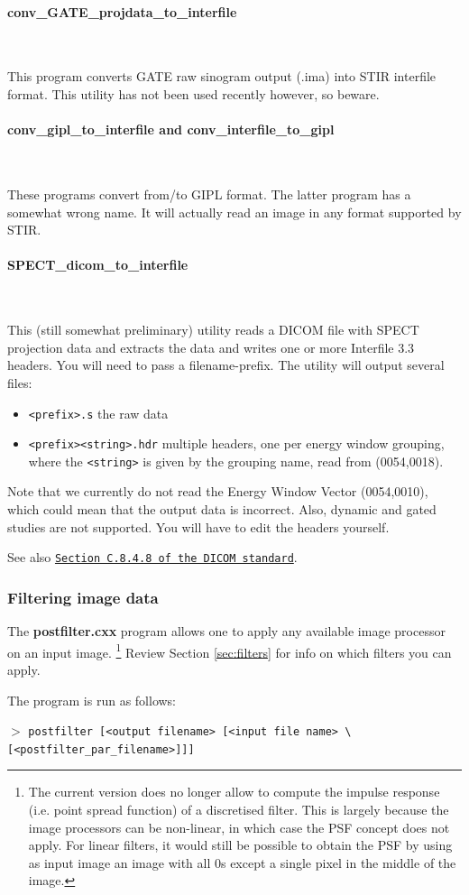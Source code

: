 \documentclass{article}
\def\url#1#2{\mbox{\href{#1}{\tt #2}}}
\newcommand{\subsubsubsection}[1]{\paragraph{#1}\mbox{} \\}
\newcommand{\cmdline}[1]{\par \noindent $>$ \texttt{#1}\par}
\begin{document}
{{{ \subsubsubsection{conv\_GATE\_projdata\_to\_interfile}
}
This program converts GATE raw sinogram output (.ima) into STIR interfile format. This utility
has not been used recently however, so beware.

{ \subsubsubsection{conv\_gipl\_to\_interfile and conv\_interfile\_to\_gipl}
}
These programs convert from/to GIPL format. The latter program has a somewhat wrong name.
It will actually read an image in any format supported by STIR.

{ \subsubsubsection{SPECT\_dicom\_to\_interfile}\label{utility:SPECT_dicom_to_interfile}}
This (still somewhat preliminary) utility reads a DICOM file with SPECT projection data and extracts the data and writes one or more Interfile 3.3
headers. You will need to pass a filename-prefix. The utility will output several files:
\begin{itemize}
\item \texttt{<prefix>.s} the raw data
\item \texttt{<prefix><string>.hdr} multiple headers, one per energy window grouping, where the \texttt{<string>} is given by the grouping name, read from (0054,0018).
\end{itemize}
Note that we currently do not read the Energy Window Vector (0054,0010), which could mean that the output data is incorrect.
Also, dynamic and gated studies are not supported. You will have to edit the headers yourself.

See also \url{https://dicom.nema.org/medical/dicom/current/output/chtml/part03/sect_C.8.4.8.html}{Section C.8.4.8 of the DICOM standard}.

\subsubsection{
Filtering image data}

The \textbf{postfilter.cxx} program allows one to apply any available 
image processor on an input image. \footnote{{\small The current version 
does no longer allow to compute the impulse response (i.e. point 
spread function) of a discretised filter. This is largely because 
the image processors can be non-linear, in which case the PSF 
concept does not apply. For linear filters, it would still be 
possible to obtain the PSF by using as input image an image with 
all 0s except a single pixel in the middle of the image.}} Review 
Section \ref{sec:filters} for info on which filters you can apply.


The program is run as follows:
\cmdline{postfilter [\texttt{<}output filename\texttt{>} [\texttt{<}input file 
name\texttt{>} {\textbackslash}\\
{[}\texttt{<}postfilter\_par\_filename\texttt{>}]]]}

}}
\end{document}
